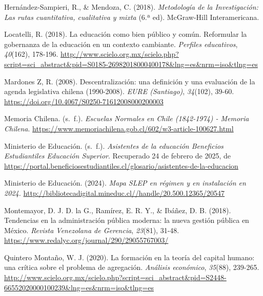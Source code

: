 \documentclass[
  12pt,
  letterpaper,
]{article}
\newlength{\cslhangindent}
\newenvironment{CSLReferences}[2] %
 {\begin{list}{}{%
  \setlength{\itemindent}{0pt}
  \setlength{\leftmargin}{0pt}
  \setlength{\parsep}{0pt}
  \ifodd #1
   \setlength{\leftmargin}{\cslhangindent}
   \setlength{\itemindent}{-1\cslhangindent}
  \fi
  \setlength{\itemsep}{#2\baselineskip}}}
 {\end{list}}
\begin{document}
\begin{CSLReferences}{1}{0}
Hernández-Sampieri, R., \& Mendoza, C. (2018). \emph{Metodología de la {Investigación}: {Las} rutas cuantitativa, cualitativa y mixta} (6.ª ed). McGraw-Hill Interamericana.

Locatelli, R. (2018). La educación como bien público y común. {Reformular} la gobernanza de la educación en un contexto cambiante. \emph{Perfiles educativos}, \emph{40}(162), 178-196. \url{http://www.scielo.org.mx/scielo.php?script=sci_abstract&pid=S0185-26982018000400178&lng=es&nrm=iso&tlng=es}

Mardones Z, R. (2008). Descentralización: una definición y una evaluación de la agenda legislativa chilena (1990-2008). \emph{EURE (Santiago)}, \emph{34}(102), 39-60. \url{https://doi.org/10.4067/S0250-71612008000200003}

Memoria Chilena. (s.~f.). \emph{Escuelas Normales en Chile (1842-1974) - Memoria Chilena}. \url{https://www.memoriachilena.gob.cl/602/w3-article-100627.html}

Ministerio de Educación. (s.~f.). \emph{Asistentes de la educación {\textbar} {Beneficios} {Estudiantiles} {Educación} {Superior}}. Recuperado 24 de febrero de 2025, de \url{https://portal.beneficiosestudiantiles.cl/glosario/asistentes-de-la-educacion}

Ministerio de Educación. (2024). \emph{Mapa {SLEP} en régimen y en instalación en 2024.} \url{http://bibliotecadigital.mineduc.cl//handle/20.500.12365/20547}

Montemayor, D. J. D. la G., Ramírez, E. R. Y., \& Ibáñez, D. B. (2018). Tendencias en la administración pública moderna: la nueva gestión pública en {México}. \emph{Revista Venezolana de Gerencia}, \emph{23}(81), 31-48. \url{https://www.redalyc.org/journal/290/29055767003/}

Quintero Montaño, W. J. (2020). La formación en la teoría del capital humano: una crítica sobre el problema de agregación. \emph{Análisis económico}, \emph{35}(88), 239-265. \url{http://www.scielo.org.mx/scielo.php?script=sci_abstract&pid=S2448-66552020000100239&lng=es&nrm=iso&tlng=es}


\end{CSLReferences}
\end{document}
